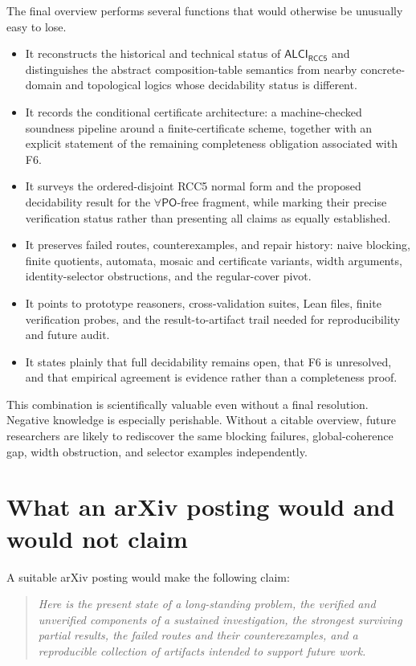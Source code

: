 \documentclass[11pt]{article}
\newcommand{\logic}{\ensuremath{\mathsf{ALCI}_{\mathsf{RCC5}}}\xspace}
\begin{document}
The final overview performs several functions that would otherwise be unusually easy to lose.

\begin{itemize}
  \item It reconstructs the historical and technical status of \logic and distinguishes the abstract composition-table semantics from nearby concrete-domain and topological logics whose decidability status is different.
  \item It records the conditional certificate architecture: a machine-checked soundness pipeline around a finite-certificate scheme, together with an explicit statement of the remaining completeness obligation associated with F6.
  \item It surveys the ordered-disjoint RCC5 normal form and the proposed decidability result for the \(\forall\mathsf{PO}\)-free fragment, while marking their precise verification status rather than presenting all claims as equally established.
  \item It preserves failed routes, counterexamples, and repair history: naive blocking, finite quotients, automata, mosaic and certificate variants, width arguments, identity-selector obstructions, and the regular-cover pivot.
  \item It points to prototype reasoners, cross-validation suites, Lean files, finite verification probes, and the result-to-artifact trail needed for reproducibility and future audit.
  \item It states plainly that full decidability remains open, that F6 is unresolved, and that empirical agreement is evidence rather than a completeness proof.
\end{itemize}

This combination is scientifically valuable even without a final resolution. Negative knowledge is especially perishable. Without a citable overview, future researchers are likely to rediscover the same blocking failures, global-coherence gap, width obstruction, and selector examples independently.

\section{What an arXiv posting would and would not claim}

A suitable arXiv posting would make the following claim:

\begin{quote}
\itshape
Here is the present state of a long-standing problem, the verified and unverified components of a sustained investigation, the strongest surviving partial results, the failed routes and their counterexamples, and a reproducible collection of artifacts intended to support future work.
\end{quote}
\end{document}
